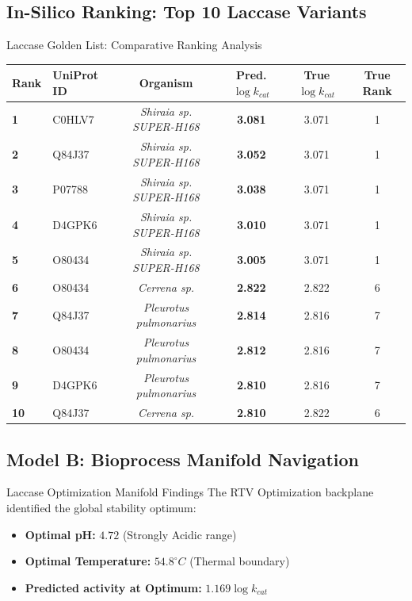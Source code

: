\documentclass[11pt,a4paper,oneside]{article}
\begin{document}
\newpage
\subsection{In-Silico Ranking: Top 10 Laccase Variants}
\begin{researchcard}{Laccase Golden List: Comparative Ranking Analysis}
\centering
\small
\begin{tabular}{llcccc}
\toprule
\textbf{Rank} & \textbf{UniProt ID} & \textbf{Organism} & \textbf{Pred. $\log k_{cat}$} & \textbf{True $\log k_{cat}$} & \textbf{True Rank} \\
\midrule
\textbf{1} & C0HLV7 & \textit{Shiraia sp. SUPER-H168} & \textbf{3.081} & 3.071 & 1 \\
\textbf{2} & Q84J37 & \textit{Shiraia sp. SUPER-H168} & \textbf{3.052} & 3.071 & 1 \\
\textbf{3} & P07788 & \textit{Shiraia sp. SUPER-H168} & \textbf{3.038} & 3.071 & 1 \\
\textbf{4} & D4GPK6 & \textit{Shiraia sp. SUPER-H168} & \textbf{3.010} & 3.071 & 1 \\
\textbf{5} & O80434 & \textit{Shiraia sp. SUPER-H168} & \textbf{3.005} & 3.071 & 1 \\
\midrule
\textbf{6} & O80434 & \textit{Cerrena sp.} & \textbf{2.822} & 2.822 & 6 \\
\textbf{7} & Q84J37 & \textit{Pleurotus pulmonarius} & \textbf{2.814} & 2.816 & 7 \\
\textbf{8} & O80434 & \textit{Pleurotus pulmonarius} & \textbf{2.812} & 2.816 & 7 \\
\textbf{9} & D4GPK6 & \textit{Pleurotus pulmonarius} & \textbf{2.810} & 2.816 & 7 \\
\textbf{10} & Q84J37 & \textit{Cerrena sp.} & \textbf{2.810} & 2.822 & 6 \\
\bottomrule
\end{tabular}
\end{researchcard}

\newpage
\subsection{Model B: Bioprocess Manifold Navigation}
\begin{mathbox}{Laccase Optimization Manifold Findings}
    The RTV Optimization backplane identified the global stability optimum:
    \begin{itemize}
        \item \textbf{Optimal pH:} $4.72$ (Strongly Acidic range)
        \item \textbf{Optimal Temperature:} $54.8^\circ C$ (Thermal boundary)
        \item \textbf{Predicted activity at Optimum:} $1.169 \log k_{cat}$
    \end{itemize}
\end{mathbox}
\end{document}
